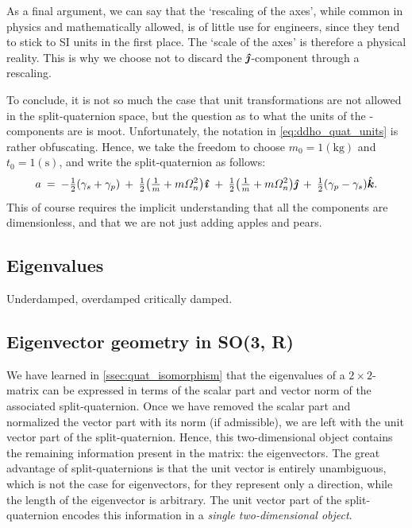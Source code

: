 As a final argument, we can say that the `rescaling of the axes', while common in physics and mathematically allowed, is of little use for engineers, since they tend to stick to SI units in the first place. The `scale of the axes' is therefore a physical reality. This is why we choose not to discard the $\quatj$-component through a rescaling.

To conclude, it is not so much the case that unit transformations are not allowed in the split-quaternion space, but the question as to what the units of the \quatj-components are is moot. Unfortunately, the notation in \cref{eq:ddho_quat_units} is rather obfuscating. Hence, we take the freedom to choose $m_0 = 1 (\si{\kilogram})$ and $t_0 = 1 (\si{\second})$, and write the split-quaternion as follows:
\begin{equation}
    a\:=\: -\tfrac{1}{2}\qty(\gamma_s + \gamma_p)\:+\:\tfrac{1}{2}\qty(\tfrac{1}{m} + m\Omega_n^2)\quati\:+\:\tfrac{1}{2}\qty(\tfrac{1}{m} + m\Omega_n^2)\quatj\:+\:\tfrac{1}{2}\qty(\gamma_p - \gamma_s)\quatk. 
    \label{eq:ddho_quat}
\end{equation}
This of course requires the implicit understanding that all the components are dimensionless, and that we are not just adding apples and pears. 

\subsection{Eigenvalues}
Underdamped, overdamped critically damped.

\subsection{Eigenvector geometry in SO(3, R)}
We have learned in \cref{ssec:quat_isomorphism} that the eigenvalues of a $2\times 2$-matrix can be expressed in terms of the scalar part and vector norm of the associated split-quaternion. Once we have removed the scalar part and normalized the vector part with its norm (if admissible), we are left with the unit vector part of the split-quaternion. Hence, this two-dimensional object contains the remaining information present in the matrix: the eigenvectors. The great advantage of split-quaternions is that the unit vector is entirely unambiguous, which is not the case for eigenvectors, for they represent only a direction, while the length of the eigenvector is arbitrary. The unit vector part of the split-quaternion encodes this information in a \emph{single two-dimensional object}.

